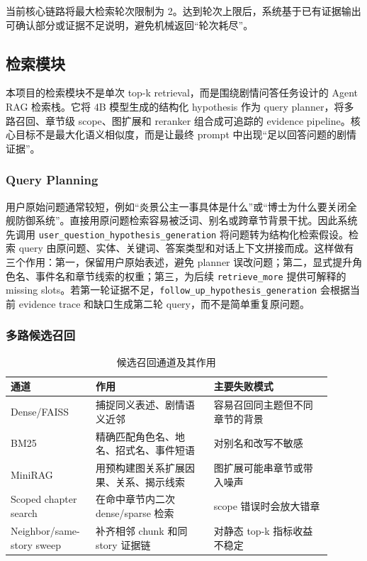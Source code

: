 \documentclass[UTF8,a4paper,12pt]{ctexart}
\newcommand{\code}[1]{\texttt{#1}}
\begin{document}
当前核心链路将最大检索轮次限制为 2。达到轮次上限后，系统基于已有证据输出可确认部分或证据不足说明，避免机械返回“轮次耗尽”。

\subsection{检索模块}

本项目的检索模块不是单次 top-k retrieval，而是围绕剧情问答任务设计的 Agent RAG 检索栈。它将 4B 模型生成的结构化 hypothesis 作为 query planner，将多路召回、章节级 scope、图扩展和 reranker 组合成可追踪的 evidence pipeline。核心目标不是最大化语义相似度，而是让最终 prompt 中出现“足以回答问题的剧情证据”。

\subsubsection{Query Planning}

用户原始问题通常较短，例如“炎景公主一事具体是什么”或“博士为什么要关闭全舰防御系统”。直接用原问题检索容易被泛词、别名或跨章节背景干扰。因此系统先调用 \code{user\_question\_hypothesis\_generation} 将问题转为结构化检索假设。检索 query 由原问题、实体、关键词、答案类型和对话上下文拼接而成。这样做有三个作用：第一，保留用户原始表述，避免 planner 误改问题；第二，显式提升角色名、事件名和章节线索的权重；第三，为后续 \code{retrieve\_more} 提供可解释的 missing slots。若第一轮证据不足，\code{follow\_up\_hypothesis\_generation} 会根据当前 evidence trace 和缺口生成第二轮 query，而不是简单重复原问题。

\subsubsection{多路候选召回}

\begin{table}[htbp]
\centering
\small
\begin{tabular}{p{0.22\linewidth}p{0.34\linewidth}p{0.34\linewidth}}
\toprule
通道 & 作用 & 主要失败模式 \\
\midrule
Dense/FAISS & 捕捉同义表述、剧情语义近邻 & 容易召回同主题但不同章节的背景 \\
BM25 & 精确匹配角色名、地名、招式名、事件短语 & 对别名和改写不敏感 \\
MiniRAG & 用预构建图关系扩展因果、关系、揭示线索 & 图扩展可能串章节或带入噪声 \\
Scoped chapter search & 在命中章节内二次 dense/sparse 检索 & scope 错误时会放大错章 \\
Neighbor/same-story sweep & 补齐相邻 chunk 和同 story 证据链 & 对静态 top-k 指标收益不稳定 \\
\bottomrule
\end{tabular}
\caption{候选召回通道及其作用}
\end{table}
\end{document}

